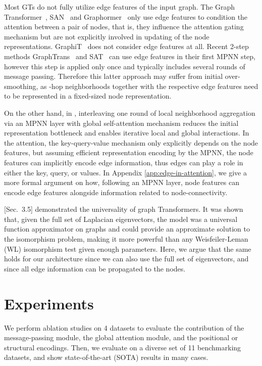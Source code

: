 \documentclass{article}
\begin{document}
Most GTs do not fully utilize edge features of the input graph. The Graph Transformer~\cite{dwivedi2020generalization}, SAN~\cite{kreuzer2021rethinking} and Graphormer~\cite{ying2021graphormer} only use edge features to condition the attention between a pair of nodes, that is, they influence the attention gating mechanism but are not explicitly involved in updating of the node representations. GraphiT~\cite{mialon2021graphit} does not consider edge features at all. Recent 2-step methods GraphTrans~\cite{jain2021graphtrans} and SAT~\cite{chen2022SAT} can use edge features in their first MPNN step, however this step is applied only once and typically includes several  rounds of message passing. Therefore this latter approach may suffer from initial over-smoothing, as -hop neighborhoods together with the respective edge features need to be represented in a fixed-sized node representation.

On the other hand, in \method, interleaving one round of local neighborhood aggregation via an MPNN layer with global self-attention mechanism reduces the initial representation bottleneck and enables iterative local and global interactions. In the attention, the key-query-value mechanism only explicitly depends on the node features, but assuming efficient representation encoding by the MPNN, the node features can implicitly encode edge information, thus edges can play a role in either the key, query, or values. In Appendix \ref{app:edge-in-attention}, we give a more formal argument on how, following an MPNN layer, node features can encode edge features alongside information related to node-connectivity.


\citet{kreuzer2021rethinking}[Sec.~3.5] demonstrated the universality of graph Transformers. It was shown that, given the full set of Laplacian eigenvectors, the model was a universal function approximator on graphs and could provide an approximate solution to the isomorphism problem, making it more powerful than any Weisfeiler-Leman (WL) isomorphism test given enough parameters.
Here, we argue that the same holds for our architecture since we can also use the full set of eigenvectors, and since all edge information can be propagated to the nodes.







\section{Experiments}
We perform ablation studies on 4 datasets to evaluate the contribution of the message-passing module, the global attention module, and the positional or structural encodings. Then, we evaluate \method on a diverse set of 11 benchmarking datasets, and show state-of-the-art (SOTA) results in many cases.
\end{document}
